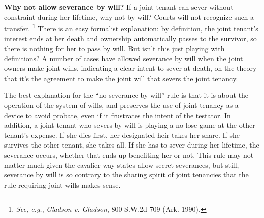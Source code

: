 \item \textbf{Why not allow severance by will?} If a joint tenant can
sever without constraint during her lifetime, why not by will? Courts will not
recognize such a transfer. \footnote{\textit{See, e.g.}, \emph{Gladson v.
Gladson}, 800 S.W.2d 709 (Ark. 1990).} There is an easy formalist explanation:
by definition, the joint tenant's interest ends at her death and ownership
automatically passes to the survivor, so there is nothing for her to pass by
will. But isn't this just playing with definitions? A number of cases have
allowed severance by will when the joint owners make joint wills, indicating a
clear intent to sever at death, on the theory that it's the agreement to make
the joint will that severs the joint tenancy.


The best explanation for the ``no severance by will'' rule is that it is about
the operation of the system of wills, and preserves the use of joint tenancy as
a device to avoid probate, even if it frustrates the intent of the testator. In
addition, a joint tenant who severs by will is playing a no-lose game at the
other tenant's expense. If she dies first, her designated heir takes her share.
If she survives the other tenant, she takes all. If she has to sever during her
lifetime, the severance occurs, whether that ends up benefiting her or not.
This rule may not matter much given the cavalier way states allow secret
severances, but still, severance by will is so contrary to the sharing spirit
of joint tenancies that the rule requiring joint wills makes sense.

